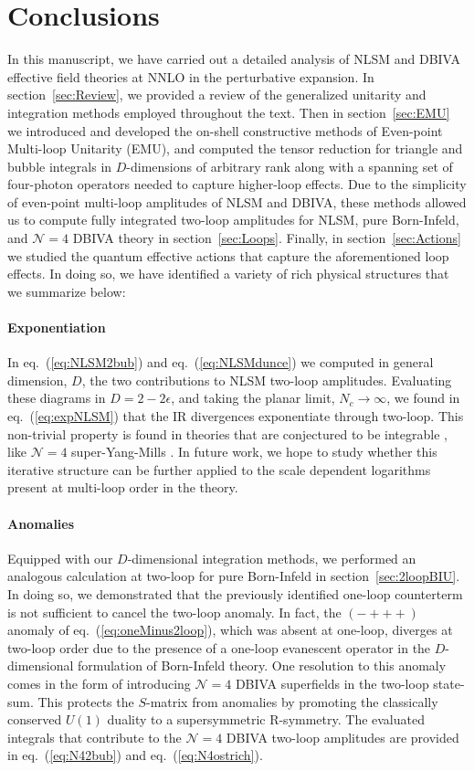 \documentclass[11pt,letter]{article}
\def\sect#1{section~\ref{#1}}
\def\eqn#1{eq.~(\ref{#1})}
\begin{document}
\section{Conclusions}\label{sec:Discussion}
In this manuscript, we have carried out a detailed analysis of NLSM and DBIVA effective field theories at NNLO in the perturbative expansion. In \sect{sec:Review}, we provided a review of the generalized unitarity and integration methods employed throughout the text. Then in \sect{sec:EMU} we introduced and developed the on-shell constructive methods of Even-point Multi-loop Unitarity (EMU), and computed the tensor reduction for triangle and bubble integrals in $D$-dimensions of arbitrary rank along with a spanning set of four-photon operators needed to capture higher-loop effects. Due to the simplicity of even-point multi-loop amplitudes of NLSM and DBIVA, these methods allowed us to compute fully integrated two-loop amplitudes for NLSM, pure Born-Infeld, and $\mathcal{N}=4$ DBIVA theory in \sect{sec:Loops}. Finally, in \sect{sec:Actions} we studied the quantum effective actions that capture the aforementioned loop effects. In doing so, we have identified a variety of rich physical structures that we summarize below: 
\paragraph{\textbf{Exponentiation}} In \eqn{eq:NLSM2bub} and \eqn{eq:NLSMdunce} we computed in general dimension, $D$, the two contributions to NLSM two-loop amplitudes. Evaluating these diagrams in $D=2-2\epsilon$, and taking the planar limit, $N_c \rightarrow \infty$, we found in \eqn{eq:expNLSM} that the IR divergences exponentiate through two-loop. This non-trivial property is found in theories that are conjectured to be integrable \cite{Shankar:1977cm,Zamolodchikov:1977nu,Zamolodchikov:1978xm, Komatsu:2019hgc}, like $\mathcal{N}=4$ super-Yang-Mills \cite{Anastasiou:2003kj,Bern:2005iz}. In future work, we hope to study whether this iterative structure can be further applied to the scale dependent logarithms present at multi-loop order in the theory. 
\paragraph{\textbf{Anomalies}} Equipped with our $D$-dimensional integration methods, we performed an analogous calculation at two-loop for pure Born-Infeld in \sect{sec:2loopBIU}. In doing so, we demonstrated that the previously identified one-loop counterterm is not sufficient to cancel the two-loop anomaly. In fact, the $(-+++)$ anomaly of \eqn{eq:oneMinus2loop}, which was absent at one-loop, diverges at two-loop order due to the presence of a one-loop evanescent operator in the $D$-dimensional formulation of Born-Infeld theory. One resolution to this anomaly comes in the form of introducing $\mathcal{N}=4$ DBIVA superfields in the two-loop state-sum. This protects the $S$-matrix from anomalies by promoting the classically conserved $U(1)$ duality to a supersymmetric R-symmetry. The evaluated integrals that contribute to the $\mathcal{N}=4$ DBIVA two-loop amplitudes are provided in \eqn{eq:N42bub} and \eqn{eq:N4ostrich}. 
\end{document}
